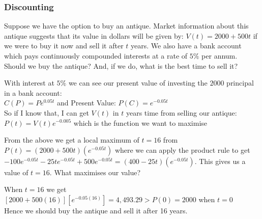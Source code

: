 \documentclass[12pt, letterpaper]{article}
\begin{document}
\subsubsection{Discounting}
Suppose we have the option to buy an antique. Market information about this antique suggests that its value in dollars will be given by: $V(t) = 2000 + 500t$ if we were to buy it now and sell it after $t$ years. We also have a bank account which pays continuously compounded interests at a rate of $5\%$ per annum.
Should we buy the antique? And, if we do, what is the best time to sell it?
\begin{center}
	With interest at $5\%$ we can see our present value of investing the $2000$ principal in a bank account:\\
	$C(P) = Pe^{0.05t}$ and Present Value: $P(C) = e^{-0.05t}$\\
	So if I know that, I can get $V(t)$ in $t$ years time from selling our antique:\\
	$P(t) = V(t)e^{-0.005}$ which is the function we want to maximise
\end{center}
From the above we get a local maximum of $t=16$ from $P(t)=(2000+500t)(e^{-0.05t})$ where we can apply the product rule to get $-100e^{-0.05t} -25te^{-0.05t}+500e^{-0.05t}=(400-25t)(e^{-0.05t})$. This gives us a value of $t=16$. What maximises our value?
\begin{center}
	When $t=16$ we get $[2000+500(16)][e^{-0.05(16)}]= 4,493.29 > P(0)=2000$ when $t=0$\\
	Hence we should buy the antique and sell it after 16 years.
\end{center}
\end{document}
